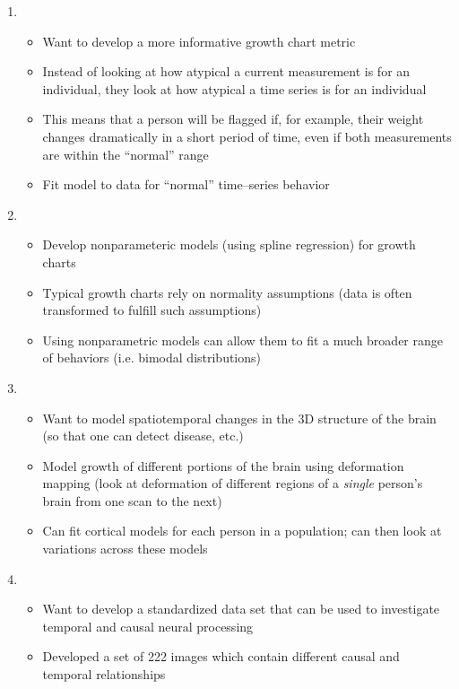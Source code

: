 \documentclass[12pt]{article}
\begin{document}
\begin{enumerate}
\item {}
\begin{itemize}
		\item Want to develop a more informative growth chart metric
		\item Instead of looking at how atypical a current measurement is for an individual, they look at how atypical a time series is for an individual 
		\item This means that a person will be flagged if, for example, their weight changes dramatically in a short period of time, even if both measurements are within the ``normal'' range
		\item Fit model to data for ``normal'' time--series behavior
\end{itemize}

\item {}
\begin{itemize}
	\item Develop nonparameteric models (using spline regression) for growth charts
	\item Typical growth charts rely on normality assumptions (data is often transformed to fulfill such assumptions)
	\item Using nonparametric models can allow them to fit a much broader range of behaviors (i.e. bimodal distributions)
\end{itemize}


\item {}
\begin{itemize}
	\item Want to model spatiotemporal changes in the 3D structure of the brain (so that one can detect disease, etc.)
	\item Model growth of different portions of the brain using deformation mapping (look at deformation of different regions of a {\em single} person's brain from one scan to the next)
	\item Can fit cortical models for each person in a population; can then look at variations across these models
\end{itemize}  

\item {}
\begin{itemize}
	\item Want to develop a standardized data set that can be used to investigate temporal and causal neural processing
	\item Developed a set of 222 images which contain different causal and temporal relationships
\end{itemize}

\end{enumerate}
\end{document}

